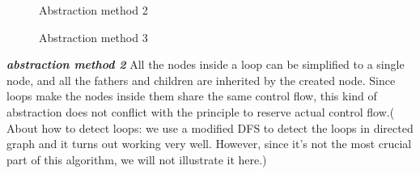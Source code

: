 \documentclass[12pt]{article}
\begin{document}
\begin{figure}[!Htb]
\centering
{}
\caption{Abstraction method 2}
\caption{Abstraction method 3}
\end{figure}


    \textit{\textbf{abstraction method 2}} All the nodes inside a loop can be simplified to a single node, and all the fathers and children are inherited by the created node. Since loops make the nodes inside them share the same control flow, this kind of abstraction does not conflict with the principle to reserve actual control flow.( About how to detect loops: we use a modified DFS to detect the loops in directed graph and it turns out working very well. However, since it's not the most crucial part of this algorithm, we will not illustrate it here.)\
    
\end{document}
